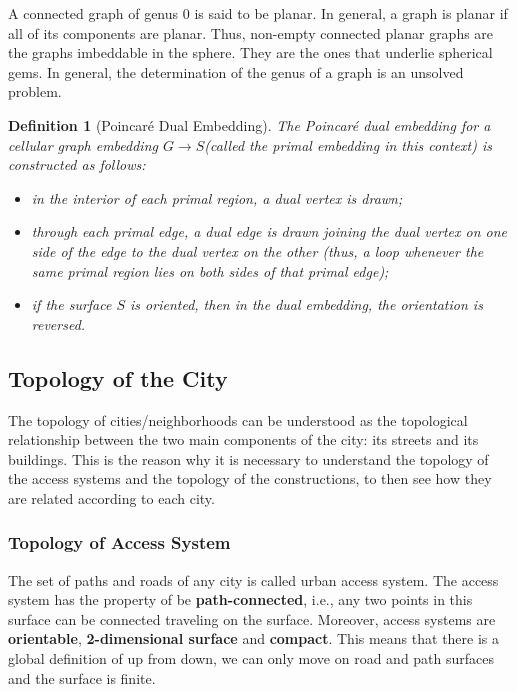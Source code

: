 \documentclass[10pt]{article}
\newtheorem{definition}{Definition}
\begin{document}
A connected graph of genus 0 is said to be planar. In general, a graph is planar if all of its components are planar. Thus, non-empty connected planar graphs are the graphs imbeddable in the sphere. They are the ones that underlie spherical gems. In general, the determination of the genus of a graph is  an unsolved problem. 


\begin{definition}[Poincar\'e Dual Embedding]
The \emph{Poincar\'e dual embedding} for a cellular graph embedding $G\xrightarrow{}S$(called \emph{the primal embedding} in this context) is constructed as follows:
    \begin{itemize}
        \item in the interior of each primal region, a \emph{dual vertex} is drawn;
        \item through each primal edge, a \emph{dual edge} is drawn joining the dual vertex on one side of the edge to the dual vertex on the other (thus, a loop whenever the same primal region lies on both sides of that primal edge);
        \item if the surface $S$ is oriented, then in the dual embedding, the orientation is reversed.
    \end{itemize}
\end{definition}

\subsection{Topology of the City}
The topology of cities/neighborhoods can be understood as the topological relationship between the two main components of the city: its streets and its buildings. This is the reason why it is necessary to understand the topology of the access systems and the topology of the constructions, to then see how they are related according to each city.

\subsubsection{Topology of Access System}
The set of paths and roads of any city is called urban access system. The access system has the property of be \textbf{path-connected}, i.e., any two points in this surface can be connected traveling on the surface. Moreover, access systems are \textbf{orientable}, \textbf{2-dimensional surface} and \textbf{compact}. This means that there is a global definition of up from down, we can only move on road and path surfaces and the surface is finite. \\
\end{document}

